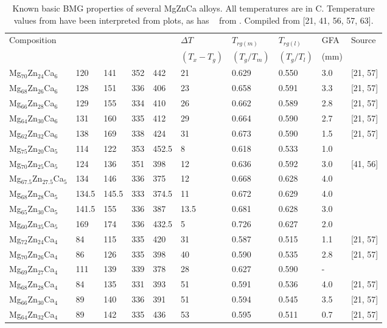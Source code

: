 \documentclass[a4paper,12pt,oneside]{report}%
\begin{document}
\begin{table}[h]
	\centering
	\begin{tabular}{ l l l l l l l l l l }
		\toprule
		Composition & \Tg  & \Tx  & \Tm  & \Tl  & $\Delta T$ & $T_{rg(m)}$ & $T_{rg(l)}$ & GFA & Source \\ 
		& & & & & $(T_{x} - T_{g})$ & $(T_{g}/T_{m})$ & $(T_{g}/T_{l})$ & (mm) & \\ 
		\midrule
		Mg$_{70}$Zn$_{24}$Ca$_{6}$ & 120 & 141 & 352 & 442 & 21 & 0.629 & 0.550 & 3.0 & [21, 57] \\ 
		Mg$_{68}$Zn$_{26}$Ca$_{6}$ & 128 & 151 & 336 & 406 & 23 & 0.658 & 0.591 & 3.3 & [21, 57] \\ 
		Mg$_{66}$Zn$_{28}$Ca$_{6}$ & 129 & 155 & 334 & 410 & 26 & 0.662 & 0.589 & 2.8 & [21, 57] \\ 
		Mg$_{64}$Zn$_{30}$Ca$_{6}$ & 131 & 160 & 335 & 412 & 29 & 0.664 & 0.590 & 2.7 & [21, 57] \\ 
		Mg$_{62}$Zn$_{32}$Ca$_{6}$ & 138 & 169 & 338 & 424 & 31 & 0.673 & 0.590 & 1.5 & [21, 57] \\ 
		Mg$_{75}$Zn$_{20}$Ca$_{5}$ & 114 & 122 & 353 & 452.5 & 8 & 0.618 & 0.533 & 1.0 & \cite{Gu2005} \\ 
		Mg$_{70}$Zn$_{25}$Ca$_{5}$ & 124 & 136 & 351 & 398 & 12 & 0.636 & 0.592 & 3.0 & [41, 56] \\ 
		Mg$_{67.5}$Zn$_{27.5}$Ca$_{5}$ & 134 & 146 & 336 & 375 & 12 & 0.668 & 0.628 & 4.0 & \cite{Gu2005} \\ 
		Mg$_{68}$Zn$_{28}$Ca$_{5}$ & 134.5 & 145.5 & 333 & 374.5 & 11 & 0.672 & 0.629 & 4.0 & \cite{Gu2005} \\ 
		Mg$_{65}$Zn$_{30}$Ca$_{5}$ & 141.5 & 155 & 336 & 387 & 13.5 & 0.681 & 0.628 & 3.0 & \cite{Gu2005} \\ 
		Mg$_{60}$Zn$_{35}$Ca$_{5}$ & 169 & 174 & 336 & 432.5 & 5 & 0.726 & 0.627 & 2.0 & \cite{Gu2005} \\ 
		Mg$_{72}$Zn$_{24}$Ca$_{4}$ & 84 & 115 & 335 & 420 & 31 & 0.587 & 0.515 & 1.1 & [21, 57] \\ 
		Mg$_{70}$Zn$_{26}$Ca$_{4}$ & 86 & 126 & 335 & 398 & 40 & 0.590 & 0.535 & 2.8 & [21, 57] \\ 
		Mg$_{69}$Zn$_{27}$Ca$_{4}$ & 111 & 139 & 339 & 378 & 28 & 0.627 & 0.590 & - & \cite{Wang2013} \\ 
		Mg$_{68}$Zn$_{28}$Ca$_{4}$ & 84 & 135 & 331 & 393 & 51 & 0.591 & 0.536 & 4.0 & [21, 57] \\ 
		Mg$_{66}$Zn$_{30}$Ca$_{4}$ & 89 & 140 & 336 & 391 & 51 & 0.594 & 0.545 & 3.5 & [21, 57] \\ 
		Mg$_{64}$Zn$_{32}$Ca$_{4}$ & 89 & 142 & 335 & 436 & 53 & 0.595 & 0.511 & 0.7 & [21, 57] \\
		\bottomrule 
	\end{tabular}
	\caption{Known basic BMG properties of several MgZnCa alloys. All temperatures are in \degree C. Temperature values from \cite{Gu2005} have been interpreted from plots, as has \Tg~ from \cite{Wang2013}. Compiled from [21, 41, 56, 57, 63].}
	\label{tab:MgZnCaAlloys}
\end{table}
\end{document}
